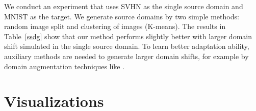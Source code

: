 \documentclass{article} \usepackage[table]{xcolor}
\begin{document}
We conduct an experiment that uses SVHN as the single source domain and MNIST as the target. We generate source domains by two simple methods: random image split and clustering of images (K-means). The results in Table~\ref{ssdg} show that our method performs slightly better with larger domain shift simulated in the single source domain. To learn better adaptation ability, auxiliary methods are needed to generate larger domain shifts, for example by domain augmentation techniques like \cite{qiao2020learning}.
\begin{table}[t]
\vspace{-2mm}
\centering
\caption{
Experiments on single source domain generalization. We use SVHN as the source domain and MNIST as the target. Our method performs slightly better with larger domain shift simulated in the single source domain.
}
\vspace{-1mm}
\centering
\label{ssdg}
\end{table}



\section{Visualizations}
\label{appvis}
\end{document}
